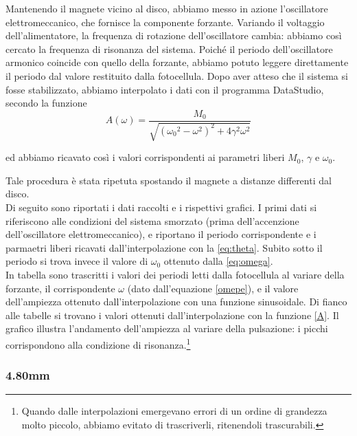 Mantenendo il magnete vicino al disco, abbiamo messo in azione l'oscillatore elettromeccanico, che fornisce la componente forzante. Variando il voltaggio dell'alimentatore,  la frequenza di rotazione dell'oscillatore cambia: abbiamo così cercato la frequenza di risonanza del sistema.
Poiché il periodo dell'oscillatore armonico coincide con quello della forzante, abbiamo potuto leggere direttamente il periodo dal valore restituito dalla fotocellula. Dopo aver atteso che il sistema si fosse stabilizzato, abbiamo interpolato i dati con il programma DataStudio, secondo la funzione
\begin{equation} \label{A}
A(\omega) = \frac{M_0}{\sqrt{ ({\omega_0}^2-\omega^2)^2 + 4\gamma^2\omega^2}}
\end{equation}

ed abbiamo ricavato così i valori corrispondenti ai parametri liberi $M_0$, $\gamma$ e $\omega_0$. 

Tale procedura è stata ripetuta spostando il magnete a distanze differenti dal disco.
\\
Di seguito sono riportati i dati raccolti e i rispettivi grafici. I primi dati si riferiscono alle condizioni del sistema smorzato (prima dell'accenzione dell'oscillatore elettromeccanico), e riportano il periodo corrispondente e i parmaetri liberi ricavati dall'interpolazione con la \ref{eq:theta}. Subito sotto il periodo si trova invece il valore di $\omega_0$ ottenuto dalla \ref{eq:omega}. \\In tabella sono trascritti i valori dei periodi letti dalla fotocellula al variare della forzante, il corrispondente $\omega$ (dato dall'equazione \ref{omepe}), e il valore dell'ampiezza ottenuto dall'interpolazione con una funzione sinusoidale. Di fianco alle tabelle si trovano i valori ottenuti dall'interpolazione con la funzione \ref{A}. Il grafico illustra l'andamento dell'ampiezza al variare della pulsazione: i picchi corrispondono alla condizione di risonanza.\footnote{Quando dalle interpolazioni emergevano errori di un ordine di grandezza molto piccolo, abbiamo evitato di trascriverli, ritenendoli trascurabili.}

\subsubsection{4.80mm}

